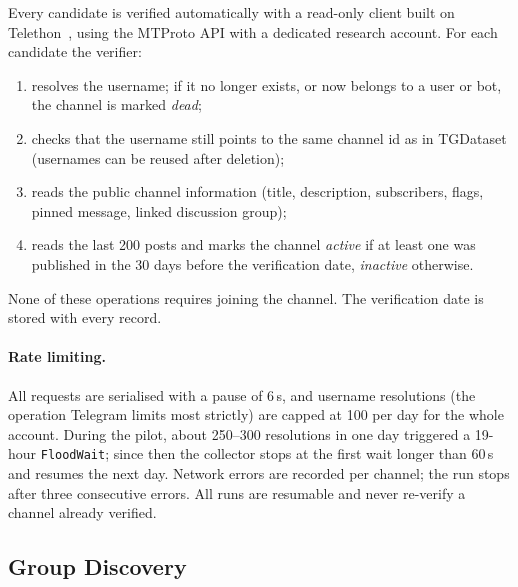 Every candidate is verified automatically with a read-only client built on
Telethon~\cite{telethon}, using the MTProto API with a dedicated research
account. For each candidate the verifier:
\begin{enumerate}
  \item resolves the username; if it no longer exists, or now belongs to a user
        or bot, the channel is marked \emph{dead};
  \item checks that the username still points to the same channel id as in
        TGDataset (usernames can be reused after deletion);
  \item reads the public channel information (title, description,
        subscribers, flags, pinned message, linked discussion group);
  \item reads the last 200 posts and marks the channel \emph{active} if at
        least one was published in the 30 days before the verification date,
        \emph{inactive} otherwise.
\end{enumerate}
None of these operations requires joining the channel. The verification date
is stored with every record. 

\paragraph{Rate limiting.}
All requests are serialised with a pause of 6\,s, and username resolutions
(the operation Telegram limits most strictly) are capped at 100 per day for
the whole account. During the pilot, about 250--300 resolutions in one day
triggered a 19-hour \texttt{FloodWait}; since then the collector stops at the
first wait longer than 60\,s and resumes the next day. Network errors are
recorded per channel; the run stops after three consecutive errors. All runs are
resumable and never re-verify a channel already verified.

\subsection{Group Discovery}
\label{subsec:group-discovery}

